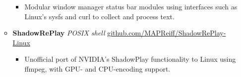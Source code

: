 \documentclass[11pt]{article}
\begin{document}
\begin{flushleft}
\begin{itemize}
\begin{itemize}
                \begin{itemize}
                    \item Modular window manager status bar modules using interfaces such as Linux's sysfs and curl to collect and process text.
                \end{itemize}
            \item \textbf{ShadowRePlay} \textit{POSIX shell} \hfill{\href{https://github.com/MAPReiff/ShadowRePlay-Linux}{github.com/MAPReiff/ShadowRePlay-Linux}}
                \begin{itemize}
                    \item Unofficial port of NVIDIA's ShadowPlay functionality to Linux using ffmpeg, with GPU- and CPU-encoding support.
                \end{itemize}
        \end{itemize}
\end{itemize}

\end{flushleft}
\end{document}
